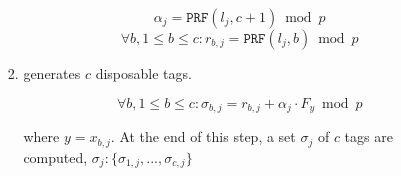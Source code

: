 \begin{enumerate}[leftmargin=.46cm]
\begin{enumerate}
\begin{enumerate}
  $$\alpha_{\scriptscriptstyle j}=\mathtt{PRF}(l_{\scriptscriptstyle j},c+1)\bmod p$$
  $$ \forall b, 1\leq b\leq c: r_{\scriptscriptstyle b,j}=\mathtt{PRF}(l_{\scriptscriptstyle j},b)\bmod p$$


\item generates $c$ disposable tags.  

$$\forall b, 1\leq b\leq c: \sigma_{\scriptscriptstyle b,j}=r_{\scriptscriptstyle b,j}+\alpha_{\scriptscriptstyle j}\cdot F_{\scriptscriptstyle y}\bmod p$$

  where $y= x_{\scriptscriptstyle b,j}$. At the end of this step, a set $\sigma_{\scriptscriptstyle j}$ of $c$ tags are computed,  $\sigma_{\scriptscriptstyle j}:\{\sigma_{\scriptscriptstyle 1,j},..., \sigma_{\scriptscriptstyle c,j}\}$





\end{enumerate}
\end{enumerate}
\end{enumerate}
